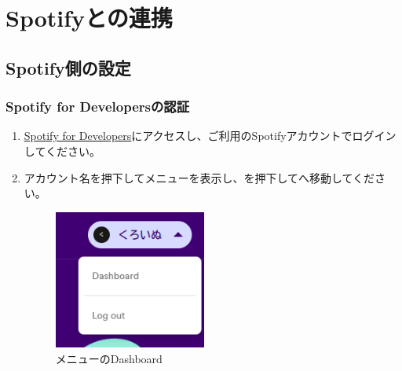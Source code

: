 \section{Spotifyとの連携 }
\label{sec:spotify1}
    \subsection{Spotify側の設定}
    \label{sec:spotify2}
        \subsubsection{Spotify for Developersの認証 }
        \label{sec:spotify3}
            \begin{enumerate}
                \item \href{https://developer.spotify.com}{Spotify for Developers}にアクセスし、ご利用のSpotifyアカウントでログインしてください。
                \label{item:spotify1}
                \item アカウント名を押下してメニューを表示し、を押下して\spotifydashboard へ移動してください。
                \label{item:spotify2}
                    \begin{figure}[htbp]
                        \centering
                        \includegraphics[width=5cm]{./pictures/spotify1.png}
                        \caption{メニューのDashboard}
                        \label{img:spotify1}
                    \end{figure}


\end{enumerate}
